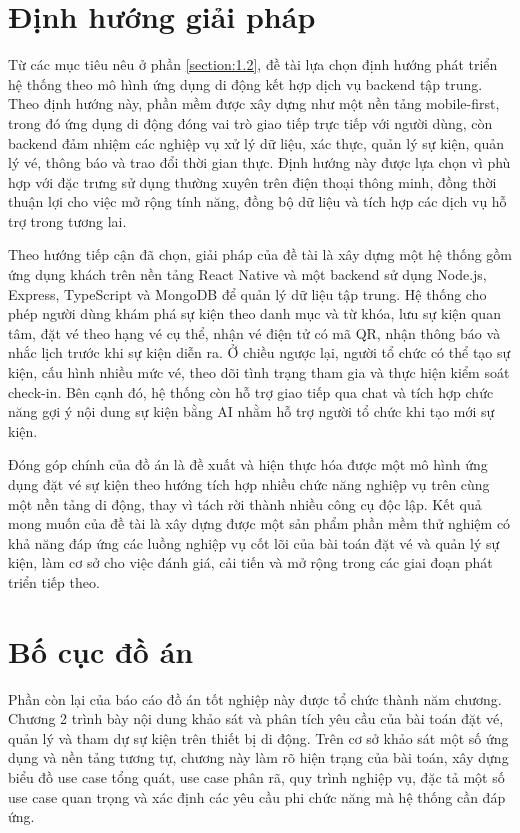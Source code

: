 \documentclass[../DoAn.tex]{subfiles}
\begin{document}
\section{Định hướng giải pháp}
\label{section:1.3}
Từ các mục tiêu nêu ở phần \ref{section:1.2}, đề tài lựa chọn định hướng phát triển hệ thống theo mô hình ứng dụng di động kết hợp dịch vụ backend tập trung. Theo định hướng này, phần mềm được xây dựng như một nền tảng mobile-first, trong đó ứng dụng di động đóng vai trò giao tiếp trực tiếp với người dùng, còn backend đảm nhiệm các nghiệp vụ xử lý dữ liệu, xác thực, quản lý sự kiện, quản lý vé, thông báo và trao đổi thời gian thực. Định hướng này được lựa chọn vì phù hợp với đặc trưng sử dụng thường xuyên trên điện thoại thông minh, đồng thời thuận lợi cho việc mở rộng tính năng, đồng bộ dữ liệu và tích hợp các dịch vụ hỗ trợ trong tương lai.

Theo hướng tiếp cận đã chọn, giải pháp của đề tài là xây dựng một hệ thống gồm ứng dụng khách trên nền tảng React Native và một backend sử dụng Node.js, Express, TypeScript và MongoDB để quản lý dữ liệu tập trung. Hệ thống cho phép người dùng khám phá sự kiện theo danh mục và từ khóa, lưu sự kiện quan tâm, đặt vé theo hạng vé cụ thể, nhận vé điện tử có mã QR, nhận thông báo và nhắc lịch trước khi sự kiện diễn ra. Ở chiều ngược lại, người tổ chức có thể tạo sự kiện, cấu hình nhiều mức vé, theo dõi tình trạng tham gia và thực hiện kiểm soát check-in. Bên cạnh đó, hệ thống còn hỗ trợ giao tiếp qua chat và tích hợp chức năng gợi ý nội dung sự kiện bằng AI nhằm hỗ trợ người tổ chức khi tạo mới sự kiện.

Đóng góp chính của đồ án là đề xuất và hiện thực hóa được một mô hình ứng dụng đặt vé sự kiện theo hướng tích hợp nhiều chức năng nghiệp vụ trên cùng một nền tảng di động, thay vì tách rời thành nhiều công cụ độc lập. Kết quả mong muốn của đề tài là xây dựng được một sản phẩm phần mềm thử nghiệm có khả năng đáp ứng các luồng nghiệp vụ cốt lõi của bài toán đặt vé và quản lý sự kiện, làm cơ sở cho việc đánh giá, cải tiến và mở rộng trong các giai đoạn phát triển tiếp theo.

\section{Bố cục đồ án}
\label{section:1.4}
Phần còn lại của báo cáo đồ án tốt nghiệp này được tổ chức thành năm chương. Chương 2 trình bày nội dung khảo sát và phân tích yêu cầu của bài toán đặt vé, quản lý và tham dự sự kiện trên thiết bị di động. Trên cơ sở khảo sát một số ứng dụng và nền tảng tương tự, chương này làm rõ hiện trạng của bài toán, xây dựng biểu đồ use case tổng quát, use case phân rã, quy trình nghiệp vụ, đặc tả một số use case quan trọng và xác định các yêu cầu phi chức năng mà hệ thống cần đáp ứng.
\end{document}
